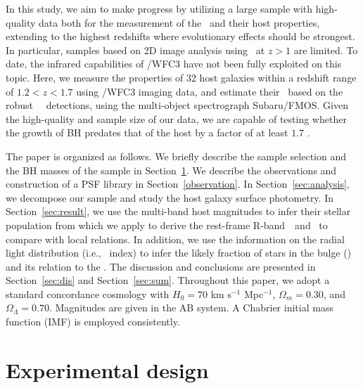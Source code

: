 \documentclass[apj]{emulateapj}
\begin{document}
In this study, we aim to make progress by utilizing a large sample with high-quality data both for the measurement of the \mbh\ and their host properties, extending to the highest redshifts where evolutionary effects should be strongest. In particular, samples based on 2D image analysis using \hst\ at $z>1$ are limited. To date, the infrared capabilities of \hst/WFC3 have not been fully exploited on this topic. Here, we measure the properties of 32 host galaxies within a redshift range of $1.2<z<1.7$ using \hst/WFC3 imaging data, and estimate their \mbh\ based on the robust \halpha\ ~detections, using the multi-object spectrograph Subaru/FMOS. Given the high-quality and sample size of our data, we are capable of testing whether the growth of BH predates that of the host by a factor of at least $1.7$ \citep[i.e., $\sim0.23$ dex,][]{Schulze2014}.

The paper is organized as follows. We briefly describe the sample selection and the BH masses of the sample in Section~\ref{sec:data}. We describe the observations and construction of a PSF library in Section~\ref{observation}. In Section~\ref{sec:analysis}, we decompose our sample and study the host galaxy surface photometry. In Section~\ref{sec:result}, we use the multi-band host magnitudes to infer their stellar population from which we apply to derive the rest-frame R-band \lhost\,~and \smass\ to compare with local relations. In addition, we use the information on the radial light distribution (i.e., \sersic\ index) to infer the likely fraction of stars in the bulge (\bmass) and its relation to the \mbh. The discussion and conclusions are presented in Section~\ref{sec:dis} and Section~\ref{sec:sum}. Throughout this paper, we adopt a standard concordance cosmology with $H_0= 70$ km s$^{-1}$ Mpc$^{-1}$, $\Omega{_m} = 0.30$, and $\Omega{_\Lambda} = 0.70$. Magnitudes are given in the AB system. A Chabrier initial mass function (IMF) is employed consistently.


\section{Experimental design}
\label{sec:data}
\end{document}
